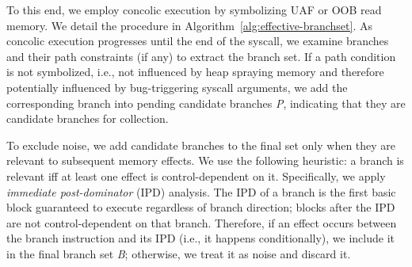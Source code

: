 To this end, we employ concolic execution by symbolizing UAF or OOB read memory. We detail the procedure in Algorithm~\ref{alg:effective-branchset}. As concolic execution progresses until the end of the syscall, we examine branches and their path constraints (if any) to extract the branch set.
If a path condition is not symbolized, i.e., not influenced by heap spraying memory and therefore potentially influenced by bug-triggering syscall arguments, we add the corresponding branch into pending candidate branches \textit{P}, indicating that they are candidate branches for collection.

To exclude noise, we add candidate branches to the final set only when they are relevant to subsequent memory effects. We use the following heuristic: a branch is relevant iff at least one effect is control-dependent on it. Specifically, we apply \textit{immediate post-dominator} (IPD) analysis. The IPD of a branch is the first basic block guaranteed to execute regardless of branch direction; blocks after the IPD are not control-dependent on that branch. Therefore, if an effect occurs between the branch instruction and its IPD (i.e., it happens conditionally), we include it in the final branch set \textit{B}; otherwise, we treat it as noise and discard it.






